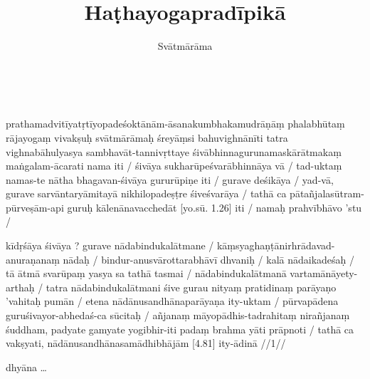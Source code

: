 \documentclass[12pt,parskip]{scrartcl}
\author{Svātmārāma}
\title{Haṭhayogapradīpikā}
\date{}
\begin{document}
\maketitle

\begin{ekdosis}
  \begin{tlg}[4.1][7.1]
    \\
  \end{tlg}

  \begin{cjyo}[4.1]
    prathamadvitīyatṛtīyopadeśoktānām-āsanakumbhakamudrāṇāṃ phalabhūtaṃ rājayogaṃ vivakṣuḥ svātmārāmaḥ śreyāṃsi bahuvighnānīti tatra vighnabāhulyasya sambhavāt-tannivṛttaye śivābhinnagurunamaskārātmakaṃ maṅgalam-ācarati nama iti /
    śivāya sukharūpeśvarābhinnāya vā /
    tad-uktaṃ namas-te nātha bhagavan-śivāya gururūpiṇe iti /
    gurave deśikāya /
    yad-vā, gurave sarvāntaryāmitayā nikhilopadeṣṭre śiveśvarāya /
    tathā ca pātañjalasūtram-pūrveṣām-api guruḥ kālenānavacchedāt [yo.sū. 1.26] iti /
    namaḥ prahvībhāvo 'stu /
    
    kīdṛśāya śivāya ? gurave nādabindukalātmane /
    kāṃsyaghaṇṭānirhrādavad-anuraṇanaṃ nādaḥ /
    bindur-anusvārottarabhāvī dhvaniḥ /
    kalā nādaikadeśaḥ /
    tā ātmā svarūpaṃ yasya sa tathā tasmai /
    nādabindukalātmanā vartamānāyety-arthaḥ /
    tatra nādabindukalātmani śive gurau nityaṃ pratidinaṃ parāyaṇo 'vahitaḥ pumān /
    etena nādānusandhānaparāyaṇa ity-uktam /
    pūrvapādena guruśivayor-abhedaś-ca sūcitaḥ /
    añjanaṃ māyopādhis-tadrahitaṃ nirañjanaṃ śuddham, padyate gamyate yogibhir-iti padaṃ brahma yāti prāpnoti /
    tathā ca vakṣyati, nādānusandhānasamādhibhājām [4.81] ity-ādinā //1//
  \end{cjyo}

  \begin{cpra}[7.1]
    dhyāna …
  \end{cpra}

  \begin{tlg}[4.2][7.2]
    \\
  \end{tlg}


\end{ekdosis}
\end{document}

